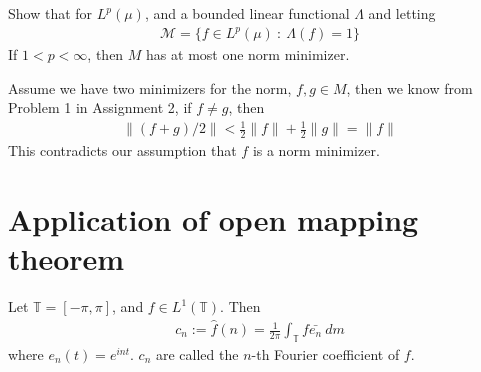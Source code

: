 

\begin{exercise}
  Show that for $L^{p}(\mu)$, and a bounded linear functional
  $\Lambda$ and letting
  \begin{align*}
    \mathcal{M} = \{ f \in L^{p}(\mu)  \ : \   \Lambda(f) = 1 \}
  \end{align*}
  If $1 < p < \infty$, then $M$ has at most one norm minimizer.
\end{exercise}
\begin{solution}
  Assume we have two minimizers for the norm, $f, g \in M$, then we
  know from Problem 1 in Assignment 2, if $f \neq g$, then
  \begin{align*}
    \|(f+g)/2\| < \frac{1}{2} \|f\| + \frac{1}{2} \|g\| = \|f\|
  \end{align*}
  This contradicts our assumption that $f$ is a norm minimizer.
\end{solution}

\section{Application of open mapping theorem}

Let $\mathbb{T} = [-\pi, \pi]$, and $f \in L^{1}(\mathbb{T})$. Then
\begin{align*}
  c_n := \hat{f}(n) = \frac{1}{2\pi} \int_{\mathbb{T}}  f \bar{e_n} \ d m
\end{align*}
where $e_n(t) = e^{int}$. $c_n$ are called the $n$-th Fourier
coefficient of $f$.


